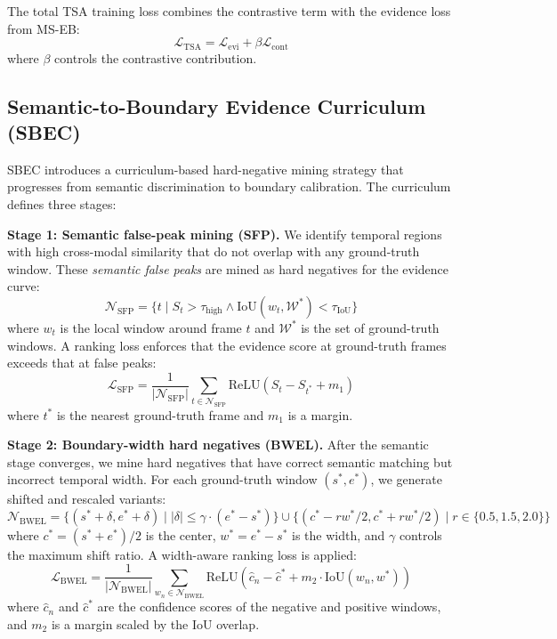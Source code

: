 \documentclass[conference]{IEEEtran}
\begin{document}
The total TSA training loss combines the contrastive term with the evidence
loss from MS-EB:
\begin{equation}
\label{eq:tsa_loss}
\mathcal{L}_{\text{TSA}} = \mathcal{L}_{\text{evi}} + \beta
\mathcal{L}_{\text{cont}}
\end{equation}
where \(\beta\) controls the contrastive contribution.

\subsection{Semantic-to-Boundary Evidence Curriculum (SBEC)}
\label{sec:sbec}

SBEC introduces a curriculum-based hard-negative mining strategy that
progresses from semantic discrimination to boundary calibration.  The
curriculum defines three stages:

\textbf{Stage 1: Semantic false-peak mining (SFP).}  We identify temporal
regions with high cross-modal similarity that do not overlap with any
ground-truth window.  These \emph{semantic false peaks} are mined as hard
negatives for the evidence curve:
\begin{equation}
\label{eq:sfp}
\mathcal{N}_{\text{SFP}} = \{t \mid S_t > \tau_{\text{high}} \wedge
\text{IoU}(w_t, \mathcal{W}^{*}) < \tau_{\text{IoU}}\}
\end{equation}
where \(w_t\) is the local window around frame \(t\) and \(\mathcal{W}^{*}\) is the
set of ground-truth windows.  A ranking loss enforces that the evidence score
at ground-truth frames exceeds that at false peaks:
\begin{equation}
\label{eq:sfp_loss}
\mathcal{L}_{\text{SFP}} = \frac{1}{|\mathcal{N}_{\text{SFP}}|}
\sum_{t \in \mathcal{N}_{\text{SFP}}} \text{ReLU}(S_t - S_{t^*} + m_1)
\end{equation}
where \(t^*\) is the nearest ground-truth frame and \(m_1\) is a margin.

\textbf{Stage 2: Boundary-width hard negatives (BWEL).}  After the semantic
stage converges, we mine hard negatives that have correct semantic matching but
incorrect temporal width.  For each ground-truth window \((s^*, e^*)\), we
generate shifted and rescaled variants:
\begin{equation}
\label{eq:bwel_gen}
\mathcal{N}_{\text{BWEL}} = \{(s^* + \delta, e^* + \delta) \mid |\delta|
\leq \gamma \cdot (e^* - s^*)\} \cup \{(c^* - r w^*/2, c^* + r w^*/2) \mid
r \in \{0.5, 1.5, 2.0\}\}
\end{equation}
where \(c^* = (s^*+e^*)/2\) is the center, \(w^* = e^* - s^*\) is the width, and
\(\gamma\) controls the maximum shift ratio.  A width-aware ranking loss is
applied:
\begin{equation}
\label{eq:bwel_loss}
\mathcal{L}_{\text{BWEL}} = \frac{1}{|\mathcal{N}_{\text{BWEL}}|}
\sum_{w_n \in \mathcal{N}_{\text{BWEL}}} \text{ReLU}(\hat{c}_n - \hat{c}^*
+ m_2 \cdot \text{IoU}(w_n, w^*))
\end{equation}
where \(\hat{c}_n\) and \(\hat{c}^*\) are the confidence scores of the negative
and positive windows, and \(m_2\) is a margin scaled by the IoU overlap.
\end{document}
